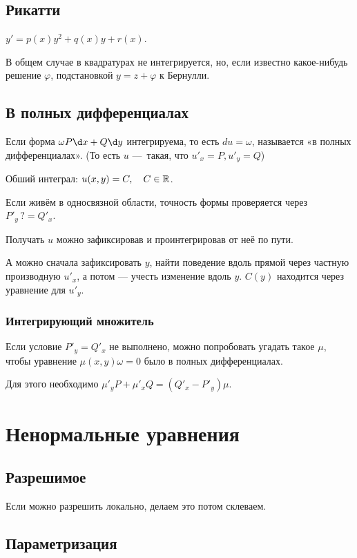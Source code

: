 \documentclass[12pt, a4paper]{article}
\begin{document}
\subsection{Рикатти}

$y' = p(x)y^2 + q(x)y + r(x)$.

В общем случае в квадратурах не интегрируется, 
но, если известно какое-нибудь решение $\varphi$, подстановкой $y = z + \varphi$ к Бернулли.

\subsection{В полных дифференциалах}

Если форма $\omega P \d x + Q \d y$ интегрируема, то есть $du = \omega$, называется «в полных дифференциалах». 
(То есть $u$ — такая, что $u'_x = P, u'_y = Q$)

Обший интеграл: $u(x, y) = C, \quad C \in {\mathbb{R}}$.

Если живём в односвязной области, точность формы проверяется через $P'_y \, ?\!\!= Q'_x$.

Получать $u$ можно зафиксировав и проинтегрировав от неё по пути.

А можно сначала зафиксировать $y$, найти поведение вдоль прямой через частную производную $u'_x$,
а потом — учесть изменение вдоль $y$. $C(y)$ находится через уравнение для $u'_y$.


\subsubsection{Интегрирующий множитель}

Если условие $P'_y = Q'_x$ не выполнено, можно попробовать угадать такое $\mu$, чтобы уравнение $\mu(x, y) \omega = 0$ было в полных дифференциалах.

Для этого необходимо $\mu'_y P + \mu'_x Q = (Q'_x - P'_y)\mu$.


\section{Ненормальные уравнения}

\subsection{Разрешимое}

Если можно разрешить локально, делаем это потом склеваем.

\subsection{Параметризация}
\end{document}
